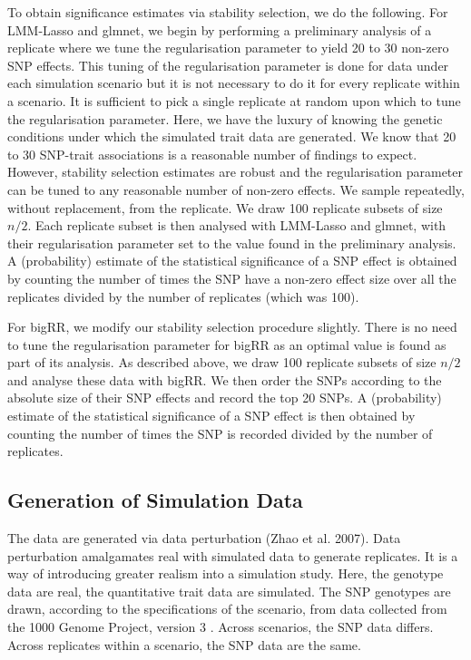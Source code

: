 \documentclass{article}
\begin{document}
To obtain significance estimates via stability selection, we do the following. For LMM-Lasso and glmnet, we begin
 by performing a preliminary analysis of a replicate where  we tune the  regularisation parameter to yield 20 to 30 non-zero SNP effects.
This tuning of the regularisation parameter is done for data under each simulation scenario but it is not necessary to do it for every replicate within a scenario. It is sufficient to pick a single replicate at random upon which to tune the regularisation parameter. 
Here, we have the luxury of knowing the genetic conditions 
under which the simulated trait data are generated. We know that 20 to 30 SNP-trait associations is a reasonable number of findings to expect. 
 However, stability selection estimates are robust  \cite{meinshausen2010stability} 
 and the regularisation parameter can be tuned to any reasonable number of 
 non-zero effects. We sample repeatedly, without replacement, from the replicate. We draw 100 replicate subsets of size $n/2$.  
Each replicate subset is then analysed with LMM-Lasso and glmnet, with their regularisation parameter set to the value found in the preliminary analysis. 
A (probability) estimate of the statistical significance of a SNP effect is obtained by counting the 
number of times the SNP have a non-zero effect size over all the replicates divided by the number of replicates (which was 100). 

For bigRR, we modify our stability selection procedure slightly. 
There is no need to tune the regularisation parameter for bigRR as an optimal value is found as part of its analysis. 
As described above, we draw 100 replicate subsets of size $n/2$ and analyse these data with bigRR. We then order the 
SNPs according to the absolute size of their SNP effects and record the top 20 SNPs. 
A (probability)  estimate of the statistical significance of a SNP effect is then obtained by counting the 
number of times the SNP is recorded divided by the number of replicates. 




\subsection{Generation of Simulation Data}

The data are generated via data perturbation (Zhao et al. 2007). Data perturbation amalgamates real with simulated data to generate replicates. 
It is a way of introducing greater realism into a simulation study. 
 Here, the genotype data are real, the 
quantitative trait data are simulated. 
 The SNP genotypes are drawn, 
according to the specifications of the scenario, from data collected from the 1000 Genome Project, version 3   \cite{10002010map}. 
Across scenarios, the SNP data differs. Across replicates within a scenario, the SNP data are the same. 
\end{document}
